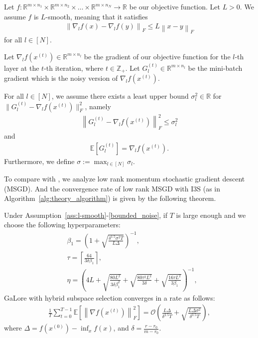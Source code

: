 \begin{assumption}[$L$-smoothness]\label{ass:l-smooth}
Let $f: \mathbb{R}^{m \times n_1} \times \mathbb{R}^{m \times n_2} \times \dots \times \mathbb{R}^{m \times n_N} \to \mathbb{R}$ be our objective function. Let $L > 0$. We assume $f$ is $L$-smooth, meaning that it satisfies
\begin{align*}
    \left \| \nabla_l f(x) - \nabla_l f(y) \right \|_F \leq L \left \| x - y \right \|_F
\end{align*}
for all $l \in [N]$.
\end{assumption}

\begin{assumption}\label{bounded_noise}


Let $\nabla_lf(x^{(t)}) \in \mathbb{R}^{m \times n_l}$ be the gradient of our objective function for the $l$-th layer at the $t$-th iteration, where $t \in \mathbb{Z}_+$.
Let $G_l^{(t)} \in \mathbb{R}^{m \times n_l}$ be the mini-batch gradient which is the noisy version of $\nabla_lf(x^{(t)})$.

For all $l \in [N]$, we assume there exists a least upper bound $\sigma_l^2 \in \mathbb{R}$ for $\| G_l^{(t)}-\nabla_lf(x^{(t)}) \|_F^2$, namely
\begin{align*}
    \left \| G_l^{(t)}-\nabla_lf(x^{(t)}) \right \| _F^2\le \sigma_l^2
\end{align*}
and
\begin{align*}
    \mathbb{E} \left [ G_l^{(t)} \right ] =\nabla_lf(x^{(t)}).
\end{align*}
Furthermore, we define
    $\sigma := \max_{l \in [N]} \sigma_l$.
\end{assumption}

To compare with \cite{he2024subspace}, we analyze low rank momentum stochastic gradient descent (MSGD). And the convergence rate of low rank MSGD with I3S (as in Algorithm~\ref{alg:theory_algorithm}) is given by the following theorem.


\begin{theorem}\label{convergence_our_method_informal}
Under Assumption~\ref{ass:l-smooth}-\ref{bounded_noise}, if $T$ is large enough and we choose the following hyperparameters:  
\begin{align*}
&\beta_1=\left(1+\sqrt{\frac{\delta^{1.5}\sigma^2T}{L\Delta}}\right)^{-1},\\
&\tau=\left \lceil \frac{64}{3\delta\beta_1} \right \rceil,\\
&\eta=\left(4L+\sqrt{\frac{80L^2}{3\delta\beta_1^2}}+\sqrt{\frac{80\tau^2L^2}{3\delta}}+\sqrt{\frac{16\tau L^2}{3\beta_1}}\right)^{-1},
\end{align*}
GaLore with hybrid subspace selection converges in a rate as follows:
\begin{align}
    \frac{1}{T}\sum_{t=0}^{T-1}\mathbb{E}\left[\left\|\nabla f(x^{(t)}) \right\|_F^2\right]=\mathcal{O}\left(\frac{L\Delta}{\delta^{2.5}T}+\sqrt{\frac{L\Delta\sigma^2}{\delta^{3.5}T}}\right),
\end{align}
where $\Delta=f(x^{(0)})-\inf_xf(x)$, and $\delta=\frac{r-r_0}{m-r_0}$.
\end{theorem}

